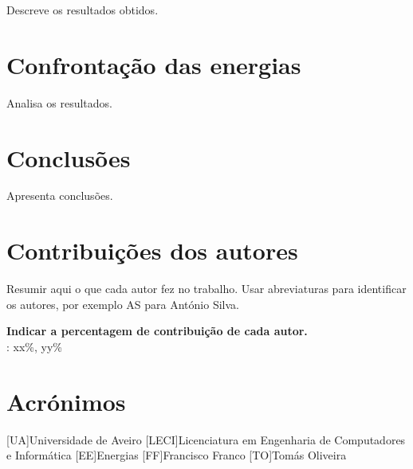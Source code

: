 \documentclass{report}
\begin{document}
\label{chap.resultados}
Descreve os resultados obtidos.

\chapter{Confrontação das energias}
\label{chap.analise}
Analisa os resultados.

\chapter{Conclusões}
\label{chap.conclusao}
Apresenta conclusões.

\chapter*{Contribuições dos autores}
Resumir aqui o que cada autor fez no trabalho.
Usar abreviaturas para identificar os autores,
por exemplo AS para António Silva.

\vspace{10pt}
\textbf{Indicar a percentagem de contribuição de cada autor.}\\

\autores : xx\%, yy\%\\

\chapter*{Acrónimos}
\begin{acronym}
[UA]{Universidade de Aveiro}
[LECI]{Licenciatura em Engenharia de Computadores e Informática}
[EE]{Energias}
[FF]{Francisco Franco}
[TO]{Tomás Oliveira}
\end{acronym}


\printbibliography
\end{document}
